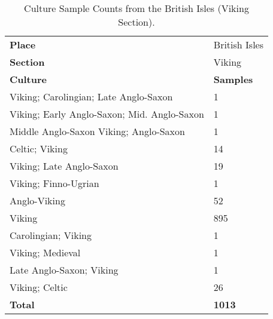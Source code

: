 \documentclass[11pt]{article}
\begin{document}
 \begin{table}[ht]
    \centering
    \small
    \begin{tabularx}{\columnwidth}{Xl}
        \hline
        \rowcolor{brown!30} \textbf{Place} & British Isles \\
        \rowcolor{brown!20} \textbf{Section} & Viking \\
        \hline
        \rowcolor{brown!10} \textbf{Culture} & \textbf{Samples} \\
        \hline
        Viking; Carolingian; Late Anglo-Saxon & 1 \\
        Viking; Early Anglo-Saxon; Mid. Anglo-Saxon & 1 \\
         Middle Anglo-Saxon 
        Viking; Anglo-Saxon & 1 \\
        Celtic; Viking & 14 \\
        Viking; Late Anglo-Saxon & 19 \\
        Viking; Finno-Ugrian & 1 \\
        Anglo-Viking & 52 \\
        Viking & 895 \\
        Carolingian; Viking & 1 \\
        Viking; Medieval & 1 \\
        Late Anglo-Saxon; Viking & 1 \\
        Viking; Celtic & 26 \\
        \hline
        \rowcolor{brown!10}\textbf{Total} & \textbf{1013} \\
        \hline
    \end{tabularx}
    \caption{Culture Sample Counts from the British Isles (Viking Section).}
    \label{tab:culture-sample-viking}
\end{table}
\end{document}
